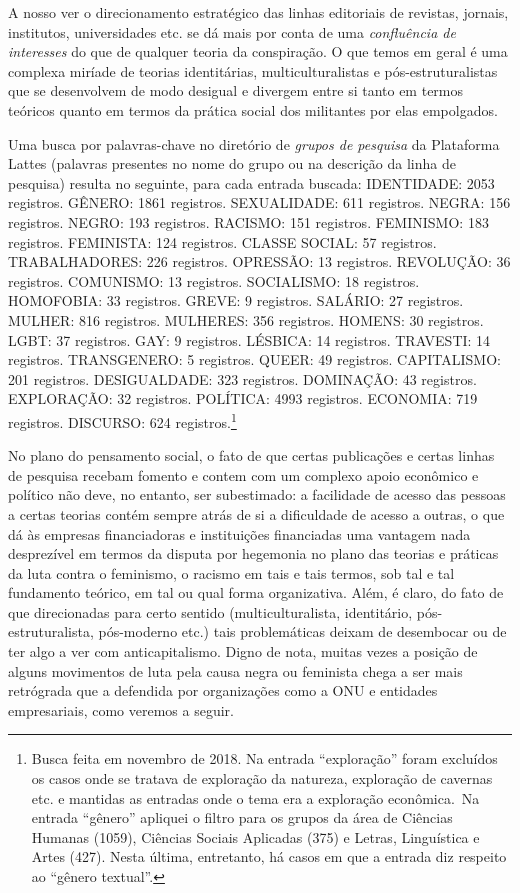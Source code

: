 A nosso ver o direcionamento estratégico das linhas editoriais de
revistas, jornais, institutos, universidades etc. se dá mais por conta
de uma \emph{confluência de interesses} do que de qualquer teoria da
conspiração. O que temos em geral é uma complexa miríade de teorias
identitárias, multiculturalistas e pós-estruturalistas que se
desenvolvem de modo desigual e divergem entre si tanto em termos
teóricos quanto em termos da prática social dos militantes por elas
empolgados.

Uma busca por palavras-chave no diretório de \emph{grupos de pesquisa}
da Plataforma Lattes (palavras presentes no nome do grupo ou na
descrição da linha de pesquisa) resulta no seguinte, para cada entrada
buscada: IDENTIDADE: 2053 registros. GÊNERO: 1861 registros.
SEXUALIDADE: 611 registros. NEGRA: 156 registros. NEGRO: 193 registros.
RACISMO: 151 registros. FEMINISMO: 183 registros. FEMINISTA: 124
registros. CLASSE SOCIAL: 57 registros. TRABALHADORES: 226 registros.
OPRESSÃO: 13 registros. REVOLUÇÃO: 36 registros. COMUNISMO: 13
registros. SOCIALISMO: 18 registros. HOMOFOBIA: 33 registros. GREVE: 9
registros. SALÁRIO: 27 registros. MULHER: 816 registros. MULHERES: 356
registros. HOMENS: 30 registros. LGBT: 37 registros. GAY: 9 registros.
LÉSBICA: 14 registros. TRAVESTI: 14 registros. TRANSGENERO: 5 registros.
QUEER: 49 registros. CAPITALISMO: 201 registros. DESIGUALDADE: 323
registros. DOMINAÇÃO: 43 registros. EXPLORAÇÃO: 32 registros. POLÍTICA:
4993 registros. ECONOMIA: 719 registros. DISCURSO: 624
registros.\footnote{Busca feita em novembro de 2018. Na entrada
  ``exploração'' foram excluídos os casos onde se tratava de exploração
  da natureza, exploração de cavernas etc. e mantidas as entradas onde o
  tema era a exploração econômica.~Na entrada ``gênero'' apliquei o
  filtro para os grupos da área de Ciências Humanas (1059), Ciências
  Sociais Aplicadas (375) e Letras, Linguística e Artes (427). Nesta
  última, entretanto, há casos em que a entrada diz respeito ao ``gênero
  textual''.}

No plano do pensamento social, o fato de que certas publicações e certas
linhas de pesquisa recebam fomento e contem com um complexo apoio
econômico e político não deve, no entanto, ser subestimado: a facilidade
de acesso das pessoas a certas teorias contém sempre atrás de si a
dificuldade de acesso a outras, o que dá às empresas financiadoras e
instituições financiadas uma vantagem nada desprezível em termos da
disputa por hegemonia no plano das teorias e práticas da luta contra o
feminismo, o racismo em tais e tais termos, sob tal e tal fundamento
teórico, em tal ou qual forma organizativa. Além, é claro, do fato de
que direcionadas para certo sentido (multiculturalista, identitário,
pós-estruturalista, pós-moderno etc.) tais problemáticas deixam de
desembocar ou de ter algo a ver com anticapitalismo. Digno de nota,
muitas vezes a posição de alguns movimentos de luta pela causa negra ou
feminista chega a ser mais retrógrada que a defendida por organizações
como a ONU e entidades empresariais, como veremos a seguir.

